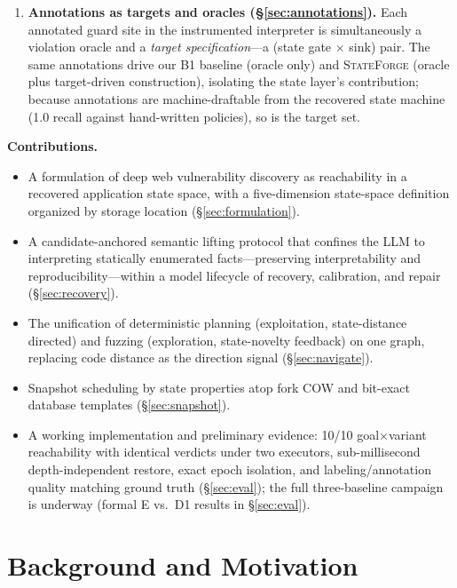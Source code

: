 \documentclass[letterpaper,twocolumn,10pt]{article}
\newcommand{\sys}{\textsc{StateForge}}
\begin{document}
\begin{enumerate}
\item \textbf{Annotations as targets and oracles (\S\ref{sec:annotations}).} Each annotated guard site in the instrumented interpreter is simultaneously a violation oracle and a \emph{target specification}---a (state gate $\times$ sink) pair. The same annotations drive our B1 baseline (oracle only) and \sys{} (oracle plus target-driven construction), isolating the state layer's contribution; because annotations are machine-draftable from the recovered state machine (1.0 recall against hand-written policies), so is the target set.
\end{enumerate}

\textbf{Contributions.}
\begin{itemize}
\item A formulation of deep web vulnerability discovery as reachability in a recovered application state space, with a five-dimension state-space definition organized by storage location (\S\ref{sec:formulation}).
\item A candidate-anchored semantic lifting protocol that confines the LLM to interpreting statically enumerated facts---preserving interpretability and reproducibility---within a model lifecycle of recovery, calibration, and repair (\S\ref{sec:recovery}).
\item The unification of deterministic planning (exploitation, state-distance directed) and fuzzing (exploration, state-novelty feedback) on one graph, replacing code distance as the direction signal (\S\ref{sec:navigate}).
\item Snapshot scheduling by state properties atop fork COW and bit-exact database templates (\S\ref{sec:snapshot}).
\item A working implementation and preliminary evidence: 10/10 goal$\times$variant reachability with identical verdicts under two executors, sub-millisecond depth-independent restore, exact epoch isolation, and labeling/annotation quality matching ground truth (\S\ref{sec:eval}); the full three-baseline campaign is underway (formal E vs.\ D1 results in \S\ref{sec:eval}). %
\end{itemize}

\section{Background and Motivation}
\label{sec:motivation}
\end{document}
